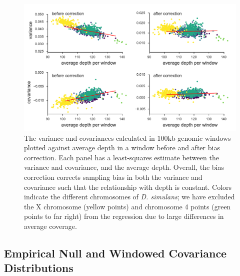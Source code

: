 \documentclass[11pt]{article}
\begin{document}
\begin{figure}[!ht]
  \centering
  \includegraphics[]{figures/barghi-correction-plot.pdf}

  \caption{The variance and covariances calculated in 100kb genomic windows
    plotted against average depth in a window before and after bias correction.
    Each panel has a least-squares estimate between the variance and
    covariance, and the average depth. Overall, the bias correction corrects
    sampling bias in both the variance and covariance such that the
    relationship with depth is constant. Colors indicate the different
    chromosomes of \emph{D. simulans}; we have excluded the X chromosome
    (yellow points) and chromosome 4 points (green points to far right) from
    the regression due to large differences in average coverage.}

  \label{suppfig:barghi-correction}
\end{figure}

\subsection{\textcite{Barghi2019-qy} Empirical Null and Windowed Covariance Distributions}
\end{document}
